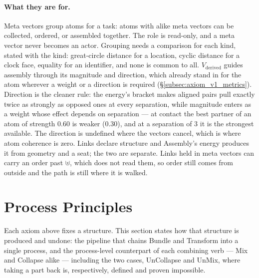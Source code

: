 \documentclass[12pt, a4paper]{article}
\begin{document}
\paragraph{What they are for.} Meta vectors group atoms for a task: atoms
with alike meta vectors can be collected, ordered, or assembled
together. The role is read-only, and a meta vector never becomes an
actor. Grouping needs a comparison for each kind, stated with the kind:
great-circle distance for a location, cyclic distance for a clock face,
equality for an identifier, and none is common to all.
$V_{\text{derived}}$ guides assembly through its magnitude and
direction, which already stand in for the atom wherever a weight or a
direction is required (\S\ref{subsec:axiom_v1_metrics}). Direction is
the cleaner rule: the energy's bracket makes aligned pairs pull exactly
twice as strongly as opposed ones at every separation, while magnitude
enters as a weight whose effect depends on separation --- at contact the
best partner of an atom of strength $0.60$ is weaker ($0.30$), and at a
separation of $3$ it is the strongest available. The direction is
undefined where the vectors cancel, which is where atom coherence is
zero. Links declare structure and Assembly's energy produces it from
geometry and a seat; the two are separate. Links held in meta vectors
can carry an order past $\uplus$, which does not read them, so order
still comes from outside and the path is still where it is walked.

\section{Process Principles}
\label{sec:process_principles}
Each axiom above fixes a structure. This section states how that
structure is produced and undone: the pipeline that chains Bundle
and Transform into a single process, and the process-level
counterpart of each combining verb --- Mix and Collapse alike ---
including the two cases, UnCollapse and UnMix, where taking a part back is, respectively, defined and proven impossible.
\end{document}
